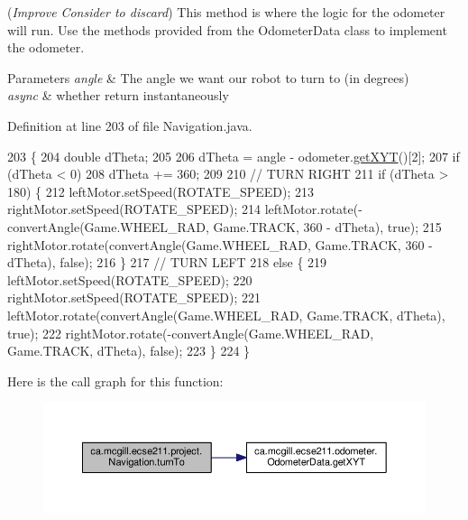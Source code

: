 ({\itshape Improve} {\itshape Consider to discard}) This method is where the logic for the odometer will run. Use the methods provided from the Odometer\+Data class to implement the odometer.


\begin{DoxyParams}{Parameters}
{\em angle} & The angle we want our robot to turn to (in degrees) \\
\hline
{\em async} & whether return instantaneously \\
\hline
\end{DoxyParams}


Definition at line 203 of file Navigation.\+java.


\begin{DoxyCode}
203                                                 \{
204     \textcolor{keywordtype}{double} dTheta;
205 
206     dTheta = angle - odometer.\hyperlink{classca_1_1mcgill_1_1ecse211_1_1odometer_1_1_odometer_data_a8f40f0264c68f0cbed4fff1723ae7863}{getXYT}()[2];
207     \textcolor{keywordflow}{if} (dTheta < 0)
208       dTheta += 360;
209 
210     \textcolor{comment}{// TURN RIGHT}
211     \textcolor{keywordflow}{if} (dTheta > 180) \{
212       leftMotor.setSpeed(ROTATE\_SPEED);
213       rightMotor.setSpeed(ROTATE\_SPEED);
214       leftMotor.rotate(-convertAngle(Game.WHEEL\_RAD, Game.TRACK, 360 - dTheta), \textcolor{keyword}{true});
215       rightMotor.rotate(convertAngle(Game.WHEEL\_RAD, Game.TRACK, 360 - dTheta), \textcolor{keyword}{false});
216     \}
217     \textcolor{comment}{// TURN LEFT}
218     \textcolor{keywordflow}{else} \{
219       leftMotor.setSpeed(ROTATE\_SPEED);
220       rightMotor.setSpeed(ROTATE\_SPEED);
221       leftMotor.rotate(convertAngle(Game.WHEEL\_RAD, Game.TRACK, dTheta), \textcolor{keyword}{true});
222       rightMotor.rotate(-convertAngle(Game.WHEEL\_RAD, Game.TRACK, dTheta), \textcolor{keyword}{false});
223     \}
224   \}
\end{DoxyCode}
Here is the call graph for this function\+:
\nopagebreak
\begin{figure}[H]
\begin{center}
\leavevmode
\includegraphics[width=350pt]{classca_1_1mcgill_1_1ecse211_1_1project_1_1_navigation_a3bbe0645f2b3b3d0986b4a707fb5a00c_cgraph}
\end{center}
\end{figure}
